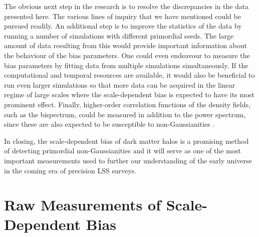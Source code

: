 \documentclass[10pt,letterpaper,final]{iopart}
\numberwithin{equation}{subsection}
\begin{document}
The obvious next step in the research is to resolve the discrepancies in the data presented here. The various lines of inquiry that we have mentioned could be pursued readily. An additional step is to improve the statistics of the data by running a number of simulations with different primordial seeds. The large amount of data resulting from this would provide important information about the behaviour of the bias parameters. One could even endeavour to measure the bias parameters by fitting data from multiple simulations simultaneously. If the computational and temporal resources are available, it would also be beneficial to run even larger simulations so that more data can be acquired in the linear regime of large scales where the scale-dependent bias is expected to have its most prominent effect. Finally, higher-order correlation functions of the density fields, such as the bispectrum, could be measured in addition to the power spectrum, since these are also expected to be susceptible to non-Gaussianities \cite{NG2}\cite{NG3}\cite{LSSSurveys}\cite{Bispec}\cite{Bispec2}.

In closing, the scale-dependent bias of dark matter halos is a promising method of detecting primordial non-Gaussianities and it will serve as one of the most important measurements used to further our understanding of the early universe in the coming era of precision LSS surveys.



\newpage


\appendix
\section{Raw Measurements of Scale-Dependent Bias}\label{sec:AppA}
\end{document}
